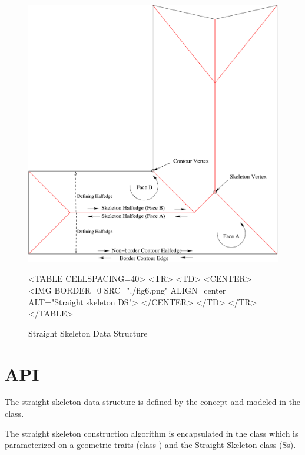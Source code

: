 \begin{figure}[htbp]
\begin{ccTexOnly}
\begin{center}
\includegraphics{Straight_skeleton_2/fig6} %
\end{center}
\end{ccTexOnly}

\begin{ccHtmlOnly}
<TABLE CELLSPACING=40>
<TR>
<TD>
<CENTER>
<IMG BORDER=0 SRC="./fig6.png" ALIGN=center ALT="Straight skeleton DS">
</CENTER>
</TD>
</TR>
</TABLE>
\end{ccHtmlOnly}

\caption{Straight Skeleton Data Structure
\label{Simplepoly-offsets}}
\end{figure}

\section{API}

The straight skeleton data structure is defined by the  concept and modeled in the  class.

The straight skeleton construction algorithm is encapsulated in the
class  which is
parameterized on a geometric traits (class
) and the Straight
Skeleton class (Ss).

